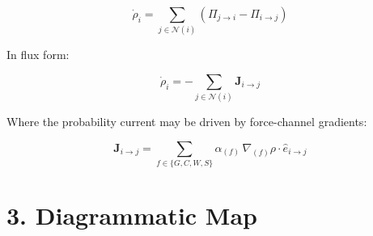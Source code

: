 \documentclass[11pt]{article}
\begin{document}
\[
\dot{\rho}_i
=
\sum_{j \in \mathcal{N}(i)}
\left(
\Pi_{j\to i} - \Pi_{i\to j}
\right)
\]



In flux form:



\[
\dot{\rho}_i
=
-\sum_{j \in \mathcal{N}(i)} \mathbf{J}_{i\to j}
\]



Where the probability current may be driven by force-channel gradients:



\[
\mathbf{J}_{i\to j}
=
\sum_{f \in \{G,C,W,S\}}
\alpha_{(f)}\,
\nabla_{(f)} \rho \cdot \hat{e}_{i\to j}
\]




\section*{3. Diagrammatic Map}
\end{document}
